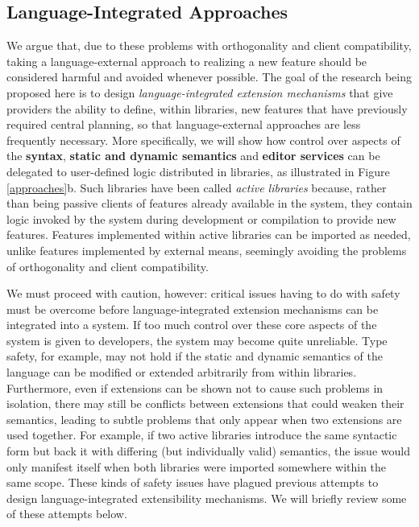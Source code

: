 \subsection{Language-Integrated Approaches}\label{language-integrated-approaches}
We argue that, due to these problems with orthogonality and client compatibility, taking a language-external approach to realizing a new feature should be considered harmful and avoided whenever possible. The goal of the research being proposed here is to design \emph{language-integrated extension mechanisms} that give providers the ability to define, within libraries, new features that have previously required central planning, 
so that language-external approaches are less frequently necessary. More specifically, we will show how control over aspects of the \textbf{syntax}, \textbf{static and dynamic semantics} and \textbf{editor services} can be delegated to user-defined logic distributed in {libraries}, as illustrated in Figure \ref{approaches}b. 
Such libraries have been called \emph{active libraries}  \cite{activelibraries} because, rather than being passive clients of features already available in the system, they contain logic invoked by the system during development or compilation to provide new features. Features implemented within active libraries can be imported as needed, unlike features implemented by external means, seemingly avoiding the problems of orthogonality and client compatibility.

We must proceed with caution, however: critical issues having to do with {safety} must be overcome before language-integrated extension mechanisms can be integrated into a system. If too much control over  these core aspects of the system is given  to developers, the system may become quite unreliable. 
Type safety, for example, may not hold if the static and dynamic semantics of the language can be modified or extended arbitrarily from within libraries. Furthermore, even if extensions can be shown not to cause such problems in isolation, there may still be conflicts between extensions that could weaken their semantics, leading to subtle problems that only appear when two extensions are used together. For example, if two active libraries introduce the same syntactic form but back it with differing (but individually valid) semantics, the issue would only manifest itself when both libraries were imported somewhere within the same scope. These kinds of safety issues have plagued previous attempts to design language-integrated extensibility mechanisms. We will briefly review some of these attempts below.%


